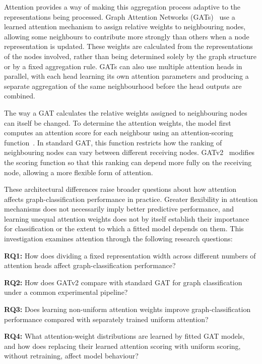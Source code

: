 \documentclass[11pt,a4paper]{article}
\begin{document}
Attention provides a way of making this aggregation process adaptive to the representations being processed. Graph Attention Networks (GATs)~\cite{velickovic2018gat} use a learned attention mechanism to assign relative weights to neighbouring nodes, allowing some neighbours to contribute more strongly than others when a node representation is updated. These weights are calculated from the representations of the nodes involved, rather than being determined solely by the graph structure or by a fixed aggregation rule. GATs can also use multiple attention heads in parallel, with each head learning its own attention parameters and producing a separate aggregation of the same neighbourhood before the head outputs are combined.

The way a GAT calculates the relative weights assigned to neighbouring nodes can itself be changed. To determine the attention weights, the model first computes an attention score for each neighbour using an attention-scoring function~\cite{velickovic2018gat}. In standard GAT, this function restricts how the ranking of neighbouring nodes can vary between different receiving nodes. GATv2~\cite{brody2022attentive} modifies the scoring function so that this ranking can depend more fully on the receiving node, allowing a more flexible form of attention.

These architectural differences raise broader questions about how attention affects graph-classification performance in practice. Greater flexibility in attention mechanisms does not necessarily imply better predictive performance, and learning unequal attention weights does not by itself establish their importance for classification or the extent to which a fitted model depends on them. This investigation examines attention through the following research questions:

\medskip
\noindent\textbf{RQ1:} How does dividing a fixed representation width across different numbers of attention heads affect graph-classification performance?

\medskip
\noindent\textbf{RQ2:} How does GATv2 compare with standard GAT for graph classification under a common experimental pipeline?

\medskip
\noindent\textbf{RQ3:} Does learning non-uniform attention weights improve graph-classification performance compared with separately trained uniform attention?

\medskip
\noindent\textbf{RQ4:} What attention-weight distributions are learned by fitted GAT models, and how does replacing their learned attention scoring with uniform scoring, without retraining, affect model behaviour?
\end{document}
